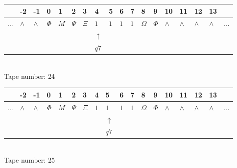 \documentclass[11pt]{article}
\begin{document}
\begin{table}[H]
\centering
\begin{tabular}{llllllllllllllllll}
 & -2 & -1 & 0 & 1 & 2 & 3 & 4 & 5 & 6 & 7 & 8 & 9 & 10 & 11 & 12 & 13 & \\
\hline
$...$ & \multicolumn{1}{|l|}{$\wedge$} & \multicolumn{1}{|l|}{$\wedge$} & \multicolumn{1}{|l|}{$\Phi$} & \multicolumn{1}{|l|}{$M$} & \multicolumn{1}{|l|}{$\Psi$} & \multicolumn{1}{|l|}{$\Xi$} & \multicolumn{1}{|l|}{$1$} & \multicolumn{1}{|l|}{$1$} & \multicolumn{1}{|l|}{$1$} & \multicolumn{1}{|l|}{$1$} & \multicolumn{1}{|l|}{$\Omega$} & \multicolumn{1}{|l|}{$\Phi$} & \multicolumn{1}{|l|}{$\wedge$} & \multicolumn{1}{|l|}{$\wedge$} & \multicolumn{1}{|l|}{$\wedge$} & \multicolumn{1}{|l|}{$\wedge$} & $...$\\
\hline
&  &  &  &  &  &  & $\uparrow$ &  &  &  &  &  &  &  &  &  &  \\
&  &  &  &  &  &  & $ q7 $ &  &  &  &  &  &  &  &  &  &  \\
\end{tabular}
\\
Tape number: 24
\noindent\makebox[\linewidth]{\hdashrule{\textwidth}{1pt}{1pt}}\end{table}

\begin{table}[H]
\centering
\begin{tabular}{llllllllllllllllll}
 & -2 & -1 & 0 & 1 & 2 & 3 & 4 & 5 & 6 & 7 & 8 & 9 & 10 & 11 & 12 & 13 & \\
\hline
$...$ & \multicolumn{1}{|l|}{$\wedge$} & \multicolumn{1}{|l|}{$\wedge$} & \multicolumn{1}{|l|}{$\Phi$} & \multicolumn{1}{|l|}{$M$} & \multicolumn{1}{|l|}{$\Psi$} & \multicolumn{1}{|l|}{$\Xi$} & \multicolumn{1}{|l|}{$1$} & \multicolumn{1}{|l|}{$1$} & \multicolumn{1}{|l|}{$1$} & \multicolumn{1}{|l|}{$1$} & \multicolumn{1}{|l|}{$\Omega$} & \multicolumn{1}{|l|}{$\Phi$} & \multicolumn{1}{|l|}{$\wedge$} & \multicolumn{1}{|l|}{$\wedge$} & \multicolumn{1}{|l|}{$\wedge$} & \multicolumn{1}{|l|}{$\wedge$} & $...$\\
\hline
&  &  &  &  &  &  &  & $\uparrow$ &  &  &  &  &  &  &  &  &  \\
&  &  &  &  &  &  &  & $ q7 $ &  &  &  &  &  &  &  &  &  \\
\end{tabular}
\\
Tape number: 25
\noindent\makebox[\linewidth]{\hdashrule{\textwidth}{1pt}{1pt}}\end{table}
\end{document}
